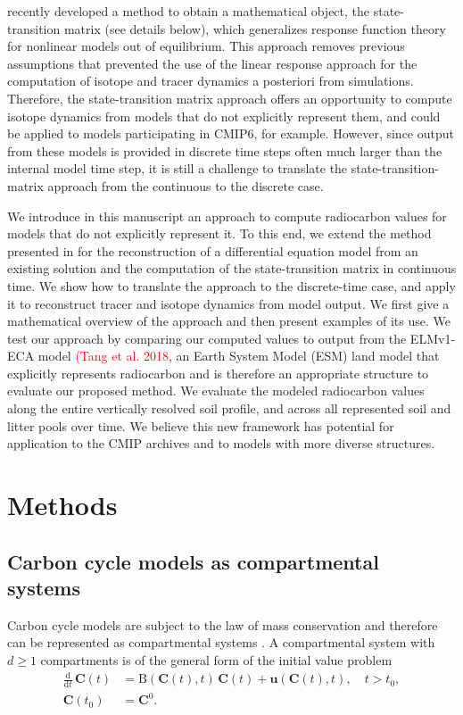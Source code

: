\documentclass[11pt,a4paper]{article}
\newcommand{\red}[1]{\textcolor{red}{#1}}
\renewcommand{\vec}[1]{\mathbf{#1}}
\newcommand{\tens}[1]{\mathrm{#1}}
\newcommand{\deriv}[1]{\frac{\mathrm{d}}{\mathrm{d}#1}}
\begin{document}
\citet{Metzler2018PNAS} recently developed a method to obtain a mathematical object, the state-transition matrix (see details below), which generalizes response function theory for nonlinear models out of equilibrium. This approach removes previous assumptions that prevented the use of the linear response approach for the computation of isotope and tracer dynamics a posteriori from simulations. Therefore, the state-transition matrix approach offers an opportunity to compute isotope dynamics from models that do not explicitly represent them, and could be applied to models participating in CMIP6, for example. However, since output from these models is provided in discrete time steps often much larger than the internal model time step, it is still a challenge to translate the state-transition-matrix approach from the continuous to the discrete case.

We introduce in this manuscript an approach to compute radiocarbon values for models that do not explicitly represent it. To this end, we extend the method presented in \citet{Metzler2018PNAS} for the reconstruction of a differential equation model from an existing solution and the computation of the state-transition matrix in continuous time. We show how to translate the approach to the discrete-time case, and apply it to reconstruct tracer and isotope dynamics from model output. We first give a mathematical overview of the approach and then present examples of its use. We test our approach by comparing our computed values to output from the ELMv1-ECA model \citep{Zhu2019, Riley2018}\red{(Tang et al. 2018}, an Earth System Model (ESM) land model that explicitly represents radiocarbon and is therefore an appropriate structure to evaluate our proposed method. We evaluate the modeled radiocarbon values along the entire vertically resolved soil profile, and across all represented soil and litter pools over time. We believe this new framework has  potential for application to the CMIP archives and to models with more diverse structures.

\section{Methods}
\subsection{Carbon cycle models as compartmental systems}
    Carbon cycle models are subject to the law of mass conservation and therefore can be represented as compartmental systems \citep{Anderson1983, Jacquez1993}.
    A compartmental system with $d\geq1$ compartments is of the general form of the initial value problem
    \begin{equation}\label{eqn:CS_td_nonlin}
        \begin{aligned}
            \deriv{t}\,\vec{C}(t) &= \tens{B}(\vec{C}(t),t)\,\vec{C}(t) + \vec{u}(\vec{C}(t),t),\quad t>t_0,\\
            \vec{C}(t_0) &= \vec{C}^0.
        \end{aligned}
    \end{equation}
    
\end{document}
